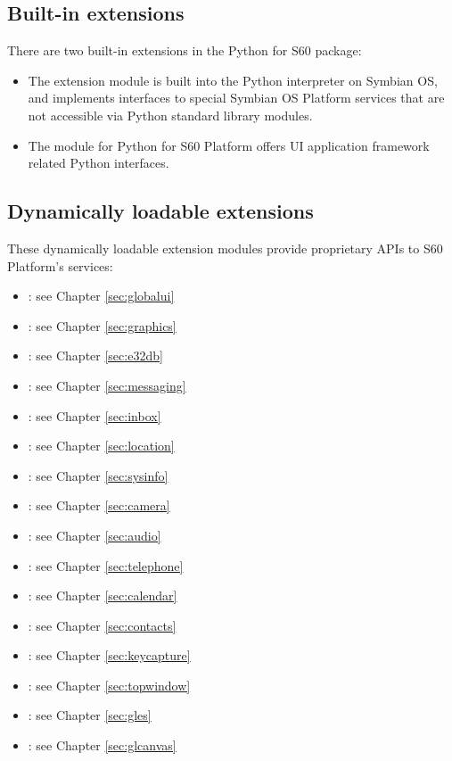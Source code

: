 \subsection{Built-in extensions}
\label{sec:built}

There are two built-in extensions in the Python for S60 package:

\begin{itemize}
\item The  extension module is built into the Python interpreter on Symbian OS, and implements interfaces to special Symbian OS Platform services that are not accessible via Python standard library modules.
\item The  module for Python for S60 Platform offers UI application framework related Python interfaces.
\end{itemize}

\subsection{Dynamically loadable extensions}
\label{sec:dynamically}

These dynamically loadable extension modules provide proprietary APIs
to S60 Platform's services: 
\begin{itemize}
\item \mbox{}: see Chapter \ref{sec:globalui}
\item \mbox{}: see Chapter \ref{sec:graphics}
\item \mbox{}: see Chapter \ref{sec:e32db}
\item \mbox{}: see Chapter \ref{sec:messaging}
\item \mbox{}: see Chapter \ref{sec:inbox}
\item \mbox{}: see Chapter \ref{sec:location}
\item \mbox{}: see Chapter \ref{sec:sysinfo}
\item \mbox{}: see Chapter \ref{sec:camera}
\item \mbox{}: see Chapter \ref{sec:audio}
\item \mbox{}: see Chapter \ref{sec:telephone}
\item \mbox{}: see Chapter \ref{sec:calendar}
\item \mbox{}: see Chapter \ref{sec:contacts}
\item \mbox{}: see Chapter \ref{sec:keycapture}
\item \mbox{}: see Chapter \ref{sec:topwindow}
\item \mbox{}: see Chapter \ref{sec:gles}
\item \mbox{}: see Chapter \ref{sec:glcanvas}
\end{itemize}

